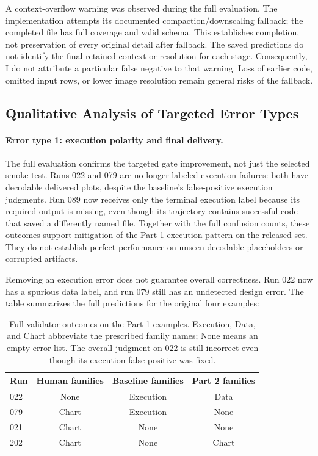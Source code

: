 \documentclass[11pt]{article}
\begin{document}
A context-overflow warning was observed during the full evaluation. The
implementation attempts its documented compaction/downscaling fallback;
the completed file has full coverage and valid schema. This establishes
completion, not preservation of every original detail after fallback.
The saved predictions do not identify the final retained context or resolution
for each stage. Consequently, I do not attribute a particular false negative
to that warning. Loss of earlier code, omitted input rows, or lower image
resolution remain general risks of the fallback.

\subsection{Qualitative Analysis of Targeted Error Types}

\paragraph{Error type 1: execution polarity and final delivery.}
The full evaluation confirms the targeted gate improvement, not just the
selected smoke test. Runs 022 and 079 are no longer labeled execution failures:
both have decodable delivered plots, despite the baseline's false-positive
execution judgments. Run 089 now receives only the terminal execution label
because its required output is missing, even though its trajectory contains
successful code that saved a differently named file.
Together with the full confusion counts, these outcomes support mitigation
of the Part 1 execution pattern on the released set. They do not establish
perfect performance on unseen decodable placeholders or corrupted artifacts.

Removing an execution error does not guarantee overall correctness. Run 022
now has a spurious data label, and run 079 still has an undetected design error.
The table summarizes the full predictions for the original four examples:
\begin{table}[htbp]
\centering
\small
\begin{tabular}{lccc}
\toprule
Run & Human families & Baseline families & Part 2 families \\
\midrule
022 & None  & Execution & Data \\
079 & Chart & Execution & None \\
021 & Chart & None      & None \\
202 & Chart & None      & Chart \\
\bottomrule
\end{tabular}
\caption{Full-validator outcomes on the Part 1 examples. Execution, Data,
and Chart abbreviate the prescribed family names; None means an empty error
list. The overall judgment on 022 is still incorrect even though its execution
false positive was fixed.}
\label{tab:part2-targeted}
\end{table}
\end{document}
